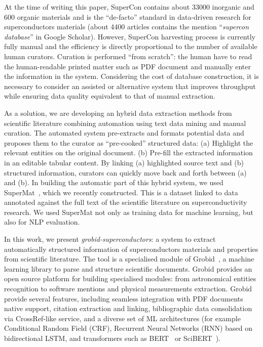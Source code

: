 \documentclass{article}
\begin{document}
At the time of writing this paper, SuperCon contains about 33000 inorganic and 600 organic materials and is the ``de-facto'' standard in data-driven research for superconductors materials  (about 4400 articles contains the mention ``\textit{supercon database}'' in Google Scholar). 
However, SuperCon harvesting process is currently fully manual and the efficiency is directly proportional to the number of available human curators.
Curation is performed ``from scratch'': the human have to read the human-readable printed matter such as PDF document and manually enter the information in the system.
Considering the cost of database construction, it is necessary to consider an assisted or alternative system that improves throughput while ensuring data quality equivalent to that of manual extraction.


As a solution, we are developing an hybrid data extraction methods from scientific literature combining automation using text data mining and manual curation.
The automated system pre-extracts and formats potential data and proposes them to the curator as ``pre-cooked'' structured data: (a) Highlight the relevant entities on the original document. 
(b) Pre-fill the extracted information in an editable tabular content. 
By linking (a) highlighted source text and (b) structured information, curators can quickly move back and forth between (a) and (b). 
In building the automatic part of this hybrid system, we used SuperMat~\cite{foppiano2021supermat}, which we recently constructed. 
This is a dataset linked to data annotated against the full text of the scientific literature on superconductivity research. 
We used SuperMat not only as training data for machine learning, but also for NLP evaluation.

In this work, we present \textit{grobid-superconductors}: a system to extract automatically structured information of superconductors materials and properties from scientific literature. 
The tool is a specialised module of Grobid~\cite{GROBID}, a machine learning library to parse and structure scientific documents. 
Grobid provides an open source platform for building specialised modules: from astronomical entities recognition to software mentions and physical measurements extraction.
Grobid provide several features, including seamless integration with PDF documents native support, citation extraction and linking, bibliographic data consolidation via CrossRef-like service,  and a diverse set of ML architectures (for example Conditional Random Field (CRF), Recurrent Neural Networks (RNN) based on bidirectional LSTM, and transformers such as BERT~\cite{devlin2018bert} or SciBERT~\cite{Beltagy2019SciBERT}).
\end{document}
